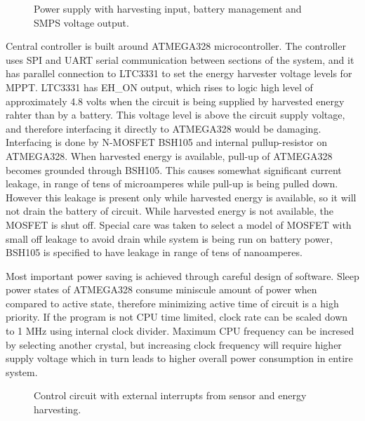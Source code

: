 \begin{figure}
    \centering
    \def\svgwidth{\columnwidth}
    
    \caption{\label{fig:psu_circuit} Power supply with harvesting input, battery management and SMPS voltage output.}
\end{figure}

Central controller is built around ATMEGA328 \cite{atmega328} microcontroller. The controller uses SPI and UART serial communication between sections of the system, and it has parallel connection to LTC3331 to set the energy harvester voltage levels for MPPT. LTC3331 has EH\_ON output, which rises to logic high level of approximately 4.8 volts when the circuit is being supplied by harvested energy rahter than by a battery. This voltage level is above the circuit supply voltage, and therefore interfacing it directly to ATMEGA328 would be damaging. Interfacing is done by N-MOSFET BSH105 \cite{BSH105} and internal pullup-resistor on ATMEGA328. When harvested energy is available, pull-up of ATMEGA328 becomes grounded through BSH105. This causes somewhat significant current leakage, in range of tens of microamperes while pull-up is being pulled down. However this leakage is present only while harvested energy is available, so it will not drain the battery of circuit. While harvested energy is not available, the MOSFET is shut off. Special care was taken to select a model of MOSFET with small off leakage to avoid drain while system is being run on battery power, BSH105 is specified to have leakage in range of tens of nanoamperes. 

Most important power saving is achieved through careful design of software. Sleep power states of ATMEGA328 consume miniscule amount of power when compared to active state, therefore minimizing active time of circuit is a high priority. If the program is not CPU time limited, clock rate can be scaled down to 1 MHz using internal clock divider. Maximum CPU frequency can be incresed by selecting another crystal, but increasing clock frequency will require higher supply voltage which in turn leads to higher overall power consumption in entire system.

\begin{figure}
    \centering
    \def\svgwidth{\columnwidth}
    
    \caption{\label{fig:atmega_circuit} Control circuit with external interrupts from sensor and energy harvesting.}
\end{figure}


